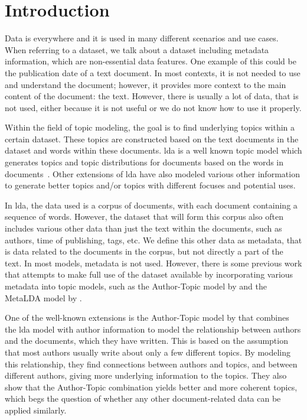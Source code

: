 \section{Introduction}\label{sec:introduction}
Data is everywhere and it is used in many different scenarios and use cases. 
When referring to a dataset, we talk about a dataset including metadata information, which are non-essential data features.
One example of this could be the publication date of a text document. 
In most contexts, it is not needed to use and understand the document; however, it provides more context to the main content of the document: the text.
However, there is usually a lot of data, that is not used, either because it is not useful or we do not know how to use it properly.

Within the field of topic modeling, the goal is to find underlying topics within a certain dataset.
These topics are constructed based on the text documents in the dataset and words within these documents. 
\Gls{lda} is a well known topic model which generates topics and topic distributions for documents based on the words in documents~\cite{blei2003latent}.
Other extensions of \gls{lda} have also modeled various other information to generate better topics and/or topics with different focuses and potential uses.

In \gls{lda}, the data used is a corpus of documents, with each document containing a sequence of words.
However, the dataset that will form this corpus also often includes various other data than just the text within the documents, such as authors, time of publishing, tags, etc.
We define this other data as metadata, that is data related to the documents in the corpus, but not directly a part of the text.
In most models, metadata is not used.
However, there is some previous work that attempts to make full use of the dataset available by incorporating various metadata into topic models, such as the Author-Topic model by \citet{author_topic_2012} and the MetaLDA model by \citet{MetaLDA2017}.

One of the well-known extensions is the Author-Topic model by \citet{author_topic_2012} that combines the \gls{lda} model with author information to model the relationship between authors and the documents, which they have written.
This is based on the assumption that most authors usually write about only a few different topics.
By modeling this relationship, they find connections between authors and topics, and between different authors, giving more underlying information to the topics.
They also show that the Author-Topic combination yields better and more coherent topics, which begs the question of whether any other document-related data can be applied similarly.

